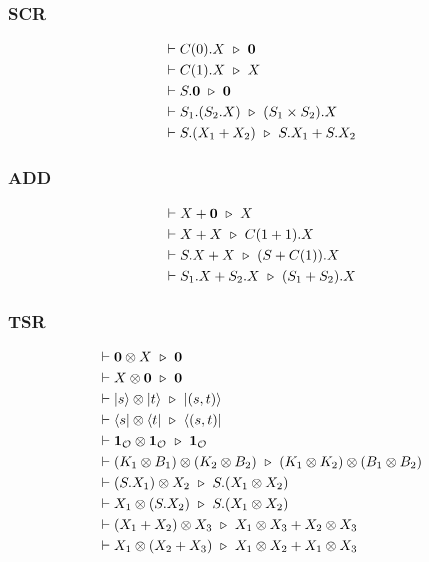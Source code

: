 \subsubsection*{\textsf{SCR}}
\begin{align*}
  & \vdash C(0).X \ \triangleright\  \mathbf{0}\\
  & \vdash C(1).X \ \triangleright\  X \\
  & \vdash S.\mathbf{0} \ \triangleright\  \mathbf{0} \\
  & \vdash S_1.(S_2.X) \ \triangleright\  (S_1 \times S_2).X \\
  & \vdash S.(X_1 + X_2) \ \triangleright\  S.X_1 + S.X_2
\end{align*}

\subsubsection*{\textsf{ADD}}
\begin{align*}
  & \vdash X + \mathbf{0} \ \triangleright\  X \\
  & \vdash X + X \ \triangleright\  C(1 + 1).X \\
  & \vdash S.X + X \ \triangleright\  (S + C(1)).X \\
  & \vdash S_1.X + S_2.X \ \triangleright\  (S_1 + S_2).X
\end{align*}

\subsubsection*{\textsf{TSR}}
\begin{align*}
  & \vdash \mathbf{0} \otimes X \ \triangleright\  \mathbf{0} \\
  & \vdash X \otimes \mathbf{0} \ \triangleright\  \mathbf{0} \\
  & \vdash |s\rangle \otimes |t\rangle\ \triangleright\  |(s, t)\rangle \\
  & \vdash \langle s| \otimes \langle t|\ \triangleright\  \langle (s, t)| \\
  & \vdash \mathbf{1}_\mathcal{O} \otimes \mathbf{1}_\mathcal{O} \ \triangleright\  \mathbf{1}_\mathcal{O} \\
  & \vdash (K_1 \otimes B_1) \otimes (K_2 \otimes B_2) \ \triangleright\  (K_1 \otimes K_2) \otimes (B_1 \otimes B_2) \\
  & \vdash (S.X_1) \otimes X_2 \ \triangleright\  S.(X_1 \otimes X_2) \\
  & \vdash X_1 \otimes (S.X_2) \ \triangleright\  S.(X_1 \otimes X_2) \\
  & \vdash (X_1 + X_2) \otimes X_3 \ \triangleright\  X_1 \otimes X_3 + X_2 \otimes X_3 \\
  & \vdash X_1 \otimes (X_2 + X_3) \ \triangleright\  X_1 \otimes X_2 + X_1 \otimes X_3
\end{align*}

